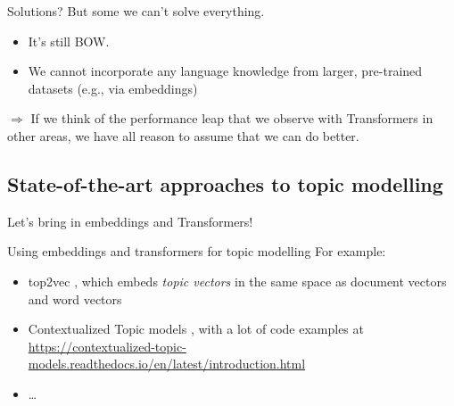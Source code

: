 \documentclass[compress]{beamer}
\begin{document}
	
	\begin{frame}{Solutions?}
	  But some we can't solve everything.
	
	  \begin{itemize}
	  \item It's still BOW.
	  \item We cannot incorporate any language knowledge from larger, pre-trained datasets (e.g., via embeddings)
	  \end{itemize}
	
	$\Rightarrow$ If we think of the performance leap that we observe with Transformers in other areas, we have all reason to assume that we can do better.
	\end{frame}
	
	
	\subsection{State-of-the-art approaches to topic modelling}
	
	\begin{frame}[standout]
	Let's bring in embeddings and Transformers!
	\end{frame}
	
	
	\begin{frame}{Using embeddings and transformers for topic modelling}
	  For example:
	  \begin{itemize}[<+->]
	  \item top2vec \parencite{angelov2020top2vec}, which embeds \emph{topic vectors} in the same space as document vectors and word vectors
	  \item Contextualized Topic models \parencite{bianchi-etal-2021-pre,bianchi-etal-2021-cross}, with a lot of code examples at \url{https://contextualized-topic-models.readthedocs.io/en/latest/introduction.html}
	  \item \ldots
		\end{itemize}
	 
	\end{frame}
	
	
	
\end{document}
